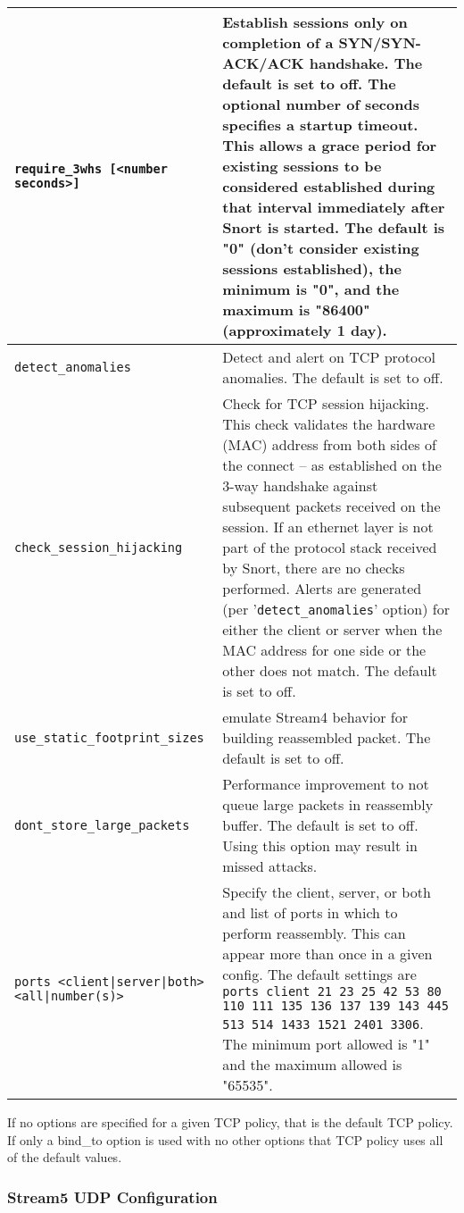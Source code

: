 \documentclass[english]{report}
\newenvironment{note}{
\samepage
    \vspace{10pt}{\textsf{
        {\hspace{7pt}\Huge{$\triangle$\hspace{-12.5pt}{\Large{$^!$}}}}\hspace{5pt}
        {\Large{NOTE}}
    }
    }
   \begin{center}
    \par\vspace{-17pt}

    \begin{lrbox}{\savepar}
    \begin{minipage}[r]{6in}
}
{
    \end{minipage}
    \end{lrbox}
    \fbox{
        \usebox{
            \savepar
	}
    }
    \par\vskip10pt
    \end{center}
}
\begin{document}
\begin{longtable}{| l | p{3.5in} |}
\hline
\texttt{require\_3whs [<number seconds>]} & Establish sessions only on completion of a SYN/SYN-ACK/ACK handshake.  The default is set to off.  The optional number of seconds specifies a startup timeout.  This allows a grace period for existing sessions to be considered established during that interval immediately after Snort is started.  The default is "0" (don't consider existing sessions established), the minimum is "0", and the maximum is "86400" (approximately 1 day).\\
\hline
\texttt{detect\_anomalies} & Detect and alert on TCP protocol anomalies.  The default is set to off.\\
\hline
\texttt{check\_session\_hijacking} & Check for TCP session hijacking.  This check validates the hardware (MAC) address from both sides of the connect -- as established on the 3-way handshake against subsequent packets received on the session.  If an ethernet layer is not part of the protocol stack received by Snort, there are no checks performed.  Alerts are generated (per '\texttt{detect\_anomalies}' option) for either the client or server when the MAC address for one side or the other does not match.  The default is set to off.\\
\hline
\texttt{use\_static\_footprint\_sizes} & emulate Stream4 behavior for building reassembled packet.  The default is set to off.\\
\hline
\texttt{dont\_store\_large\_packets} & Performance improvement to not queue large packets in reassembly buffer.  The default is set to off.  Using this option may result in missed attacks.\\
\hline
\texttt{ports <client|server|both> <all|number(s)>} & 
Specify the client, server, or both and list of ports in which to perform reassembly.  This can appear more than once in a given config.  The default settings are \texttt{ports client 21 23 25 42 53 80 110 111 135 136 137 139 143 445 513 514 1433 1521 2401 3306}.  The minimum port allowed is "1" and the maximum allowed is "65535".\\
\hline
\end{longtable}

\begin{note}
If no options are specified for a given TCP policy, that is the default
TCP policy.  If only a bind\_to option is used with no other options that
TCP policy uses all of the default values.
\end{note}

\subsubsection{Stream5 UDP Configuration}
\end{document}
